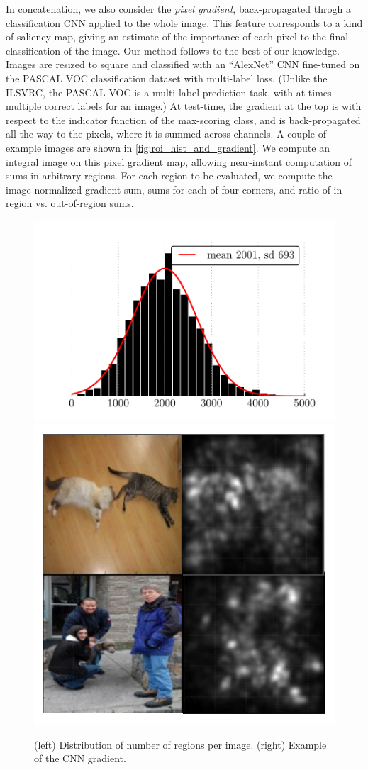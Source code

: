 In concatenation, we also consider the \emph{pixel gradient}, back-propagated throgh a classification CNN applied to the whole image.
This feature corresponds to a kind of saliency map, giving an estimate of the importance of each pixel to the final classification of the image.
Our method follows \cite{Simonyan-ICLR-2014} to the best of our knowledge.
Images are resized to square and classified with an ``AlexNet'' \cite{Krizhevsky-NIPS-2012} CNN fine-tuned on the PASCAL VOC classification dataset with multi-label loss.
(Unlike the ILSVRC, the PASCAL VOC is a multi-label prediction task, with at times multiple correct labels for an image.)
At test-time, the gradient at the top is with respect to the indicator function of the max-scoring class, and is back-propagated all the way to the pixels, where it is summed across channels.
A couple of example images are shown in \autoref{fig:roi_hist_and_gradient}.
We compute an integral image on this pixel gradient map, allowing near-instant computation of sums in arbitrary regions.
For each region to be evaluated, we compute the image-normalized gradient sum, sums for each of four corners, and ratio of in-region vs. out-of-region sums.

\begin{figure}
\centering
\includegraphics[width=0.52\linewidth]{../ccnn/figures/roi_hist.pdf}
\hfill
\includegraphics[width=0.4\linewidth]{../ccnn/figures/gradient.pdf}
\caption{
(left) Distribution of number of regions per image.
(right) Example of the CNN gradient.
}\label{fig:roi_hist_and_gradient}
\end{figure}


